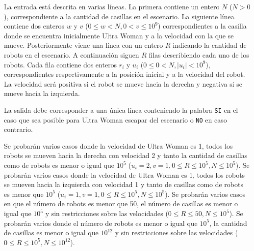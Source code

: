 \documentclass{oci}
\begin{document}
\begin{inputDescription}
  La entrada está descrita en varias líneas.
  La primera contiene un entero $N$ ($N>0$), correspondiente a la cantidad de
  casillas en el escenario.
  La siguiente línea contiene dos enteros $w$ y $v$ ($0\leq w< N, 0<v\leq 10^9$)
  correspondientes a la casilla donde se encuentra inicialmente Ultra Woman y a la
  velocidad con la que se mueve.
  Posteriormente viene una línea con un entero $R$ indicando la cantidad de
  robots en el escenario.
  A continuación siguen $R$ filas describiendo cada uno de los robots.
  Cada fila contiene dos enteros $r_i$ y $u_i$ ($0\leq 0 < N, |u_i|< 10^9$),
  correspondientes respectivamente a la posición inicial y a la velocidad del
  robot.
  La velocidad será positiva si el robot se mueve hacia la derecha y negativa si
  se mueve hacia la izquierda.
\end{inputDescription}

\begin{outputDescription}
La salida debe corresponder a una única línea conteniendo la palabra \texttt{SI}
en el caso que sea posible para Ultra Woman escapar del escenario o \texttt{NO}
en caso contrario.
\end{outputDescription}

\begin{scoreDescription}
   Se probarán varios casos donde la velocidad de Ultra Woman es 1,
  todos los robots se mueven hacia la derecha con velocidad 2 y tanto la
  cantidad de casillas como de robots es menor o igual que $10^5$ ($u_i=2, v=1,
  0\leq R\leq 10^5, N\leq 10^5$).
   Se probarán varios casos donde la velocidad de Ultra Woman es 1,
  todos los robots se mueven hacia la izquierda con velocidad 1 y tanto
  de casillas como de robots es menor que $10^5$ ($u_i=1, v=1, 0\leq R\leq 10^5,
  N\leq 10^5$).
   Se probarán varios casos en que el número de robots es menor que
  50, el número de casillas es menor o igual que $10^5$ y sin restricciones sobre las
  velocidades ($0\leq R\leq 50, N\leq 10^5$).
   Se probarán varios donde el número de robots es menor o igual que
  $10^5$, la cantidad de casillas es menor o igual que $10^{12}$ y sin
  restricciones sobre las velocidades ($0\leq R\leq 10^5, N \leq10^{12}$).
\end{scoreDescription}

\begin{sampleDescription}
\end{sampleDescription}
\end{document}
